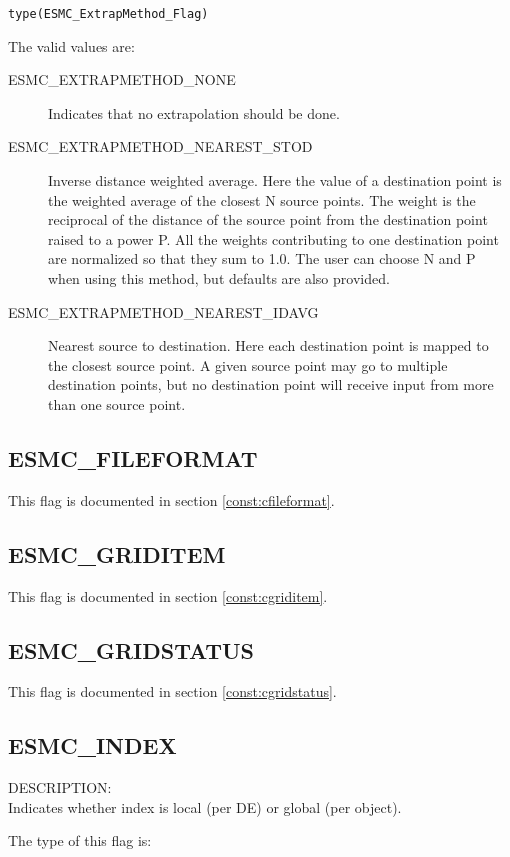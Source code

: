 {\tt type(ESMC\_ExtrapMethod\_Flag)}

The valid values are:
\begin{description}
\item [ESMC\_EXTRAPMETHOD\_NONE]
      Indicates that no extrapolation should be done. 
\item [ESMC\_EXTRAPMETHOD\_NEAREST_STOD]
      Inverse distance weighted average. 
      Here the value of a destination point is the weighted average of the 
      closest N source points. The weight is the reciprocal of the distance of 
      the source point from the destination point raised to a power P. All the
      weights contributing to one destination point are normalized so that they 
      sum to 1.0. The user can choose N and P when using this method, but 
      defaults are also provided.  
\item [ESMC\_EXTRAPMETHOD\_NEAREST_IDAVG]
      Nearest source to destination. 
      Here each destination point is mapped to the closest source point. A given 
      source point may go to multiple destination points, but no destination 
      point will receive input from more than one source point. 
\end{description}

\subsection{ESMC\_FILEFORMAT}
This flag is documented in section \ref{const:cfileformat}.

\subsection{ESMC\_GRIDITEM}
This flag is documented in section \ref{const:cgriditem}.

\subsection{ESMC\_GRIDSTATUS}
This flag is documented in section \ref{const:cgridstatus}.

\subsection{ESMC\_INDEX}
\label{const:indexflag}

{\sf DESCRIPTION:\\}
Indicates whether index is local (per DE) or global (per object).

The type of this flag is:

